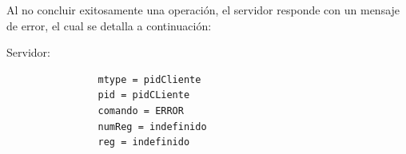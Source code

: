 \documentclass[a4paper,10pt]{article}
\begin{document}
	Al no concluir exitosamente una operaci\'on, el servidor responde con un mensaje de error, el cual se detalla a continuaci\'on:

		Servidor:
			\begin{verbatim}
				mtype = pidCliente 
				pid = pidCLiente
				comando = ERROR
				numReg = indefinido
				reg = indefinido
			\end{verbatim}


%	
%	
%	
\end{document}
